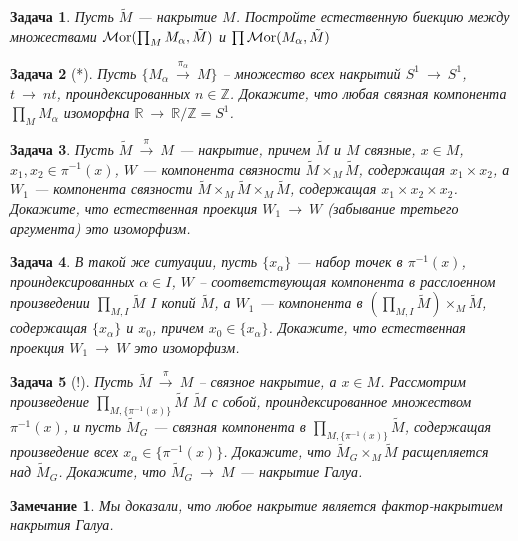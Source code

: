 \documentclass[12pt]{book}
\newcommand{\arrow}{{\:\longrightarrow\:}}
\newcommand{\Mor}{\operatorname{{\cal M}or}}
\def\Z{{\mathbb Z}}
\def\R{{\mathbb R}}
\theoremstyle{upshape}
\newtheorem{zadacha}{Задача}[chapter]
\theoremstyle{generic}
\theoremstyle{upshapenonumber}
\newtheorem{zamechanie}{Замечание}[chapter]
\newcommand{\следствие}{%
     \refstepcounter{teorema}
     {\noindent\bf Следствие \thechapter.\arabic{teorema}:\ }}
\newcommand{\пример}{%
     \refstepcounter{teorema}
     {\noindent\bf Пример \thechapter.\arabic{teorema}:\ }}
\newcommand{\лемма}{%
     \refstepcounter{teorema}
     {\noindent\bf Лемма \thechapter.\arabic{teorema}:\ }}
\newcommand{\теорема}{%
     \refstepcounter{teorema}
     {\noindent\bf Теорема \thechapter.\arabic{teorema}:\ }}
\newcommand{\утверждение}{%
     \refstepcounter{teorema}
     {\noindent\bf Утверждение \thechapter.\arabic{teorema}:\ }}
\begin{document}
{\begin{zadacha} 
Пусть $\tilde M$ --- накрытие $M$.
Постройте естественную биекцию между множествами
$\Mor(\prod_M M_{\alpha}, \tilde M)$
и $\prod \Mor(M_{\alpha}, \tilde M)$
\end{zadacha}

\begin{zadacha}[*]
Пусть $\{M_\alpha\stackrel{\pi_\alpha}\arrow M\}$ --
множество всех накрытий $S^1 \arrow S^1$, $t\arrow nt$,
проиндексированных $n\in \Z$. Докажите, что любая
связная компонента $\prod_M M_{\alpha}$ изоморфна
$\R\arrow \R/\Z = S^1$.
\end{zadacha}

\begin{zadacha} 
Пусть $\tilde M\stackrel\pi\arrow M$ --- накрытие, причем $\tilde M$ и $M$
связные, $x\in M$, $x_1, x_2 \in \pi^{-1}(x)$, $W$ --- компонента
связности $\tilde M\times_M\tilde M$, содержащая $x_1\times x_2$,
а $W_1$ --- компонента связности $\tilde M\times_M\tilde M\times_M\tilde M$, 
содержащая $x_1\times x_2\times x_2$. Докажите, что
естественная проекция $W_1 \arrow W$ (забывание третьего
аргумента) это изоморфизм. 
\end{zadacha}

\begin{zadacha} 
В такой же ситуации, пусть 
$\{x_\alpha\}$ --- набор точек в $\pi^{-1}(x)$,
проиндексированных $\alpha\in I$, $W$ --
соответствующая компонента в расслоенном 
произведении $\prod_{M,I}\tilde M$ $I$ копий $\tilde M$, а $W_1$ --- 
компонента в 
$\left(\prod_{M,I}\tilde M\right)\times_M\tilde M$,
содержащая $\{x_\alpha\}$ и $x_0$, причем $x_0\in \{x_\alpha\}$.
Докажите, что естественная проекция $W_1 \arrow W$ это
изоморфизм.
\end{zadacha}

\begin{zadacha}[!]
Пусть $\tilde M \stackrel \pi \arrow M$ --
связное накрытие, а $x\in M$. Рассмотрим произведение 
$\prod_{M,\{\pi^{-1}(x)\}}\tilde M$ 
$\tilde M$ с собой, проиндексированное множеством 
$\pi^{-1}(x)$, и пусть $\tilde M_G$ --- связная компонента 
в $\prod_{M,\{\pi^{-1}(x)\}}\tilde M$, содержащая
произведение всех $x_\alpha \in \{\pi^{-1}(x)\}$.
Докажите, что $\tilde M_G\times_M \tilde M$
расщепляется над $\tilde M_G$. Докажите, что
$\tilde M_G \arrow M$ --- накрытие Галуа.
\end{zadacha}

\begin{zamechanie}
Мы доказали, что любое
накрытие является фактор-накрытием накрытия Галуа.
\end{zamechanie}

}
\end{document}
